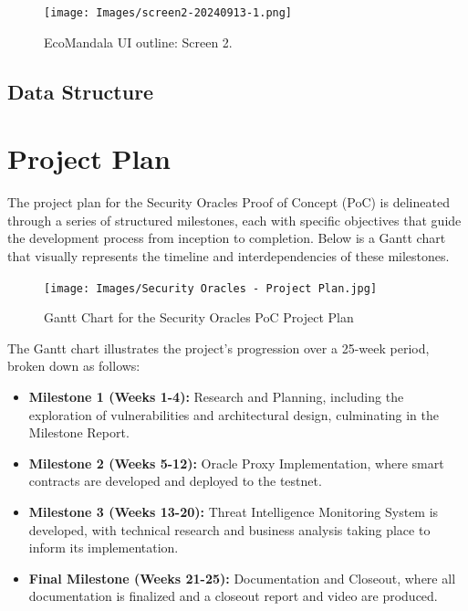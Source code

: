 \documentclass{scrreport}
\begin{document}
\begin{figure}[H]
\centering
\texttt{[image: Images/screen2-20240913-1.png]}
\caption{EcoMandala UI outline: Screen 2.}
\label{fig:ui-screen-2}
\end{figure}

\newpage
\subsection{Data Structure}


\newpage


\section{Project Plan}

The project plan for the Security Oracles Proof of Concept (PoC) is delineated through a series of structured milestones, each with specific objectives that guide the development process from inception to completion. Below is a Gantt chart that visually represents the timeline and interdependencies of these milestones.

\begin{figure}[H]
\centering
\texttt{[image: Images/Security Oracles - Project Plan.jpg]}
\caption{Gantt Chart for the Security Oracles PoC Project Plan}
\label{fig:gantt_chart}
\end{figure}

The Gantt chart illustrates the project's progression over a 25-week period, broken down as follows:

\begin{itemize}
  \item \textbf{Milestone 1 (Weeks 1-4):} Research and Planning, including the exploration of vulnerabilities and architectural design, culminating in the Milestone Report.
  \item \textbf{Milestone 2 (Weeks 5-12):} Oracle Proxy Implementation, where smart contracts are developed and deployed to the testnet.
  \item \textbf{Milestone 3 (Weeks 13-20):} Threat Intelligence Monitoring System is developed, with technical research and business analysis taking place to inform its implementation.
  \item \textbf{Final Milestone (Weeks 21-25):} Documentation and Closeout, where all documentation is finalized and a closeout report and video are produced.
\end{itemize}
\end{document}
